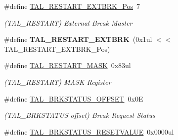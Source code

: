 \begin{DoxyCompactItemize}
\item 
\hypertarget{group___s_a_m_l21___t_a_l_ga11ebbcf0c61505549ec1505a1c32c0b6}{}\#define \hyperlink{group___s_a_m_l21___t_a_l_ga11ebbcf0c61505549ec1505a1c32c0b6}{T\+A\+L\+\_\+\+R\+E\+S\+T\+A\+R\+T\+\_\+\+E\+X\+T\+B\+R\+K\+\_\+\+Pos}~7\label{group___s_a_m_l21___t_a_l_ga11ebbcf0c61505549ec1505a1c32c0b6}

\begin{DoxyCompactList}\small\item\em (T\+A\+L\+\_\+\+R\+E\+S\+T\+A\+R\+T) External Break Master \end{DoxyCompactList}\item 
\hypertarget{group___s_a_m_l21___t_a_l_ga5ebfd569693de46582880ce48c7c18c3}{}\#define {\bfseries T\+A\+L\+\_\+\+R\+E\+S\+T\+A\+R\+T\+\_\+\+E\+X\+T\+B\+R\+K}~(0x1ul $<$$<$ T\+A\+L\+\_\+\+R\+E\+S\+T\+A\+R\+T\+\_\+\+E\+X\+T\+B\+R\+K\+\_\+\+Pos)\label{group___s_a_m_l21___t_a_l_ga5ebfd569693de46582880ce48c7c18c3}

\item 
\hypertarget{group___s_a_m_l21___t_a_l_ga447d31579981e9cc288a15d316d3e6d5}{}\#define \hyperlink{group___s_a_m_l21___t_a_l_ga447d31579981e9cc288a15d316d3e6d5}{T\+A\+L\+\_\+\+R\+E\+S\+T\+A\+R\+T\+\_\+\+M\+A\+S\+K}~0x83ul\label{group___s_a_m_l21___t_a_l_ga447d31579981e9cc288a15d316d3e6d5}

\begin{DoxyCompactList}\small\item\em (T\+A\+L\+\_\+\+R\+E\+S\+T\+A\+R\+T) M\+A\+S\+K Register \end{DoxyCompactList}\item 
\hypertarget{group___s_a_m_l21___t_a_l_ga9d8ea050516e288b98296caeda7a0c7e}{}\#define \hyperlink{group___s_a_m_l21___t_a_l_ga9d8ea050516e288b98296caeda7a0c7e}{T\+A\+L\+\_\+\+B\+R\+K\+S\+T\+A\+T\+U\+S\+\_\+\+O\+F\+F\+S\+E\+T}~0x0\+E\label{group___s_a_m_l21___t_a_l_ga9d8ea050516e288b98296caeda7a0c7e}

\begin{DoxyCompactList}\small\item\em (T\+A\+L\+\_\+\+B\+R\+K\+S\+T\+A\+T\+U\+S offset) Break Request Status \end{DoxyCompactList}\item 
\hypertarget{group___s_a_m_l21___t_a_l_ga4bdedbd3989522491b87abee3c927ad4}{}\#define \hyperlink{group___s_a_m_l21___t_a_l_ga4bdedbd3989522491b87abee3c927ad4}{T\+A\+L\+\_\+\+B\+R\+K\+S\+T\+A\+T\+U\+S\+\_\+\+R\+E\+S\+E\+T\+V\+A\+L\+U\+E}~0x0000ul\label{group___s_a_m_l21___t_a_l_ga4bdedbd3989522491b87abee3c927ad4}


\end{DoxyCompactItemize}
